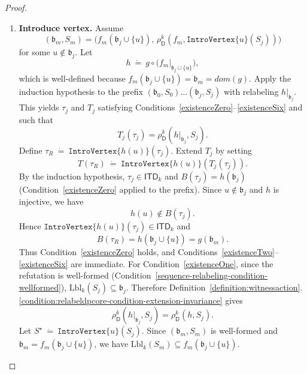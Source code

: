 \documentclass[10pt,a4paper]{amsart}
\newcommand{\abag}{\mathfrak{b}}
\newcommand{\abstractdecomposition}{\tau}
\newcommand{\action}{\rho}
\newcommand{\allabstractdecompositionstreewidth}[1]{\mathsf{ITD}_{#1}}
\newcommand{\defeq}{~\dot{=}~}
\newcommand{\domain}{dom}
\newcommand{\dpcore}{\mathsf{D}}
\newcommand{\dprefutation}{R}
\newcommand{\introvertextype}[1]{\mathtt{IntroVertex}\{#1\}}
\newcommand{\relabelingfunction}{f}
\newcommand{\subtermToBag}{T}
\newcommand{\topbag}[1]{\topbagname(#1)}
\newcommand{\topbagname}{B}
\newcommand{\treewidthvalue}{k}
\newcommand{\vertexone}{u}
\newcommand{\witnessset}{S}
\begin{document}
\begin{proof}
\begin{enumerate}
\item \textbf{Introduce vertex.}
Assume
\[
(\abag_m,\witnessset_m)
=
\bigl(\relabelingfunction_m(\abag_j\cup\{\vertexone\}),\,\action_{\dpcore}^{\treewidthvalue}(\relabelingfunction_m,\introvertextype{\vertexone}(\witnessset_j))\bigr)
	\]
	for some $\vertexone\notin \abag_j$.
	Let
	\[
	h \defeq g\circ \bigl(\relabelingfunction_m|_{\abag_j\cup\{\vertexone\}}\bigr),
	\]
	which is well-defined because $\relabelingfunction_m(\abag_j\cup\{\vertexone\})=\abag_m=\domain(g)$.
	Apply the induction hypothesis to the prefix $(\abag_0,\witnessset_0)\dots(\abag_j,\witnessset_j)$ with relabeling $h|_{\abag_j}$.
	This yields $\abstractdecomposition_j$ and $\subtermToBag_j$ satisfying Conditions~\ref{existenceZero}--\ref{existenceSix} and such that
	\[
	\subtermToBag_j(\abstractdecomposition_j)=\action_{\dpcore}^{\treewidthvalue}(h|_{\abag_j},\witnessset_j).
	\]
	Define $\abstractdecomposition_{\dprefutation}\defeq \introvertextype{h(\vertexone)}(\abstractdecomposition_j)$.
	Extend $\subtermToBag_j$ by setting
	\[
	\subtermToBag(\abstractdecomposition_{\dprefutation})\defeq \introvertextype{h(\vertexone)}(\subtermToBag_j(\abstractdecomposition_j)).
	\]
	By the induction hypothesis, $\abstractdecomposition_j\in \allabstractdecompositionstreewidth{\treewidthvalue}$ and $\topbag{\abstractdecomposition_j}=h(\abag_j)$ (Condition~\ref{existenceZero} applied to the prefix).
	Since $\vertexone\notin \abag_j$ and $h$ is injective, we have
	\[
	h(\vertexone)\notin \topbag{\abstractdecomposition_j}.
	\]
	Hence $\introvertextype{h(\vertexone)}(\abstractdecomposition_j)\in \allabstractdecompositionstreewidth{\treewidthvalue}$ and
	\[
	\topbag{\abstractdecomposition_{\dprefutation}}
	= h(\abag_j\cup\{\vertexone\})
	= g(\abag_m).
	\]
		Thus Condition~\ref{existenceZero} holds, and Conditions~\ref{existenceTwo}--\ref{existenceSix} are immediate.
		For Condition~\ref{existenceOne}, since the refutation is well-formed (Condition~\ref{sequence-relabeling-condition-wellformed}), $\mathrm{Lbl}_{\treewidthvalue}(\witnessset_j)\subseteq \abag_j$.
		Therefore Definition~\ref{definition:witnessaction}.\ref{condition:relabeldpcore-condition-extension-invariance} gives
		\[
		\action_{\dpcore}^{\treewidthvalue}(h|_{\abag_j},\witnessset_j)=\action_{\dpcore}^{\treewidthvalue}(h,\witnessset_j).
		\]
		Let $S^\star\defeq \introvertextype{\vertexone}(\witnessset_j)$.
		Since $(\abag_m,\witnessset_m)$ is well-formed and $\abag_m=\relabelingfunction_m(\abag_j\cup\{\vertexone\})$, we have $\mathrm{Lbl}_{\treewidthvalue}(\witnessset_m)\subseteq \relabelingfunction_m(\abag_j\cup\{\vertexone\})$.

\end{enumerate}
\end{proof}
\end{document}
